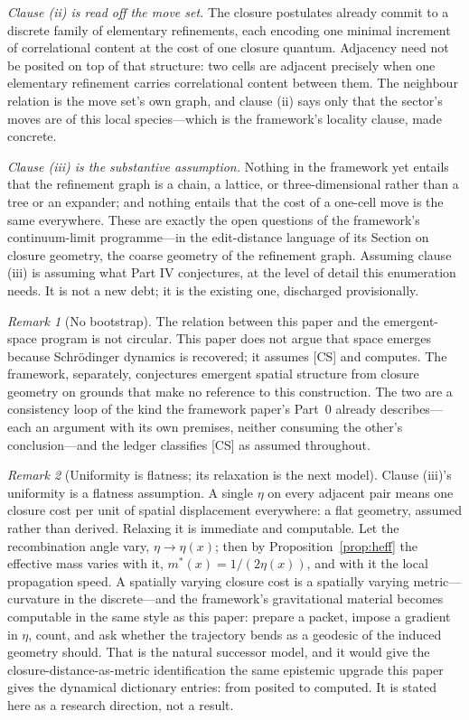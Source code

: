 \documentclass[11pt]{article}
\theoremstyle{definition}
\theoremstyle{remark}
\newtheorem{remark}{Remark}
\begin{document}
\emph{Clause (ii) is read off the move set.} The closure postulates already commit to a discrete family of elementary refinements, each encoding one minimal increment of correlational content at the cost of one closure quantum. Adjacency need not be posited on top of that structure: two cells are adjacent precisely when one elementary refinement carries correlational content between them. The neighbour relation is the move set's own graph, and clause (ii) says only that the sector's moves are of this local species---which is the framework's locality clause, made concrete.

\emph{Clause (iii) is the substantive assumption.} Nothing in the framework yet entails that the refinement graph is a chain, a lattice, or three-dimensional rather than a tree or an expander; and nothing entails that the cost of a one-cell move is the same everywhere. These are exactly the open questions of the framework's continuum-limit programme---in the edit-distance language of its Section on closure geometry, the coarse geometry of the refinement graph. Assuming clause (iii) is assuming what Part IV conjectures, at the level of detail this enumeration needs. It is not a new debt; it is the existing one, discharged provisionally.

\begin{remark}[No bootstrap]\label{rem:loop}
The relation between this paper and the emergent-space program is not circular. This paper does not argue that space emerges because Schr\"odinger dynamics is recovered; it assumes [CS] and computes. The framework, separately, conjectures emergent spatial structure from closure geometry on grounds that make no reference to this construction. The two are a consistency loop of the kind the framework paper's Part~0 already describes---each an argument with its own premises, neither consuming the other's conclusion---and the ledger classifies [CS] as assumed throughout.
\end{remark}

\begin{remark}[Uniformity is flatness; its relaxation is the next model]\label{rem:flat}
Clause (iii)'s uniformity is a flatness assumption. A single $\eta$ on every adjacent pair means one closure cost per unit of spatial displacement everywhere: a flat geometry, assumed rather than derived. Relaxing it is immediate and computable. Let the recombination angle vary, $\eta \to \eta(x)$; then by Proposition~\ref{prop:heff} the effective mass varies with it, $m^\ast(x) = 1/(2\eta(x))$, and with it the local propagation speed. A spatially varying closure cost is a spatially varying metric---curvature in the discrete---and the framework's gravitational material becomes computable in the same style as this paper: prepare a packet, impose a gradient in $\eta$, count, and ask whether the trajectory bends as a geodesic of the induced geometry should. That is the natural successor model, and it would give the closure-distance-as-metric identification the same epistemic upgrade this paper gives the dynamical dictionary entries: from posited to computed. It is stated here as a research direction, not a result.
\end{remark}
\end{document}
